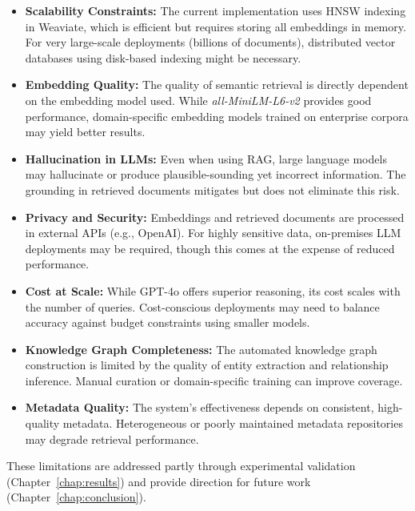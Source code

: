 \begin{itemize}
    \item \textbf{Scalability Constraints:} The current implementation uses HNSW indexing in Weaviate, which is efficient but requires storing all embeddings in memory. For very large-scale deployments (billions of documents), distributed vector databases using disk-based indexing might be necessary.
    
    \item \textbf{Embedding Quality:} The quality of semantic retrieval is directly dependent on the embedding model used. While \textit{all-MiniLM-L6-v2} provides good performance, domain-specific embedding models trained on enterprise corpora may yield better results.
    
    \item \textbf{Hallucination in LLMs:} Even when using \gls{RAG}, large language models may hallucinate or produce plausible-sounding yet incorrect information. The grounding in retrieved documents mitigates but does not eliminate this risk.
    
    \item \textbf{Privacy and Security:} Embeddings and retrieved documents are processed in external APIs (e.g., OpenAI). For highly sensitive data, on-premises \gls{LLM} deployments may be required, though this comes at the expense of reduced performance.
    
    \item \textbf{Cost at Scale:} While \gls{GPT}-4o offers superior reasoning, its cost scales with the number of queries. Cost-conscious deployments may need to balance accuracy against budget constraints using smaller models.
    
    \item \textbf{Knowledge Graph Completeness:} The automated knowledge graph construction is limited by the quality of entity extraction and relationship inference. Manual curation or domain-specific training can improve coverage.
    
    \item \textbf{Metadata Quality:} The system's effectiveness depends on consistent, high-quality metadata. Heterogeneous or poorly maintained metadata repositories may degrade retrieval performance.
    
\end{itemize}

These limitations are addressed partly through experimental validation (Chapter~\ref{chap:results}) and provide direction for future work (Chapter~\ref{chap:conclusion}).





